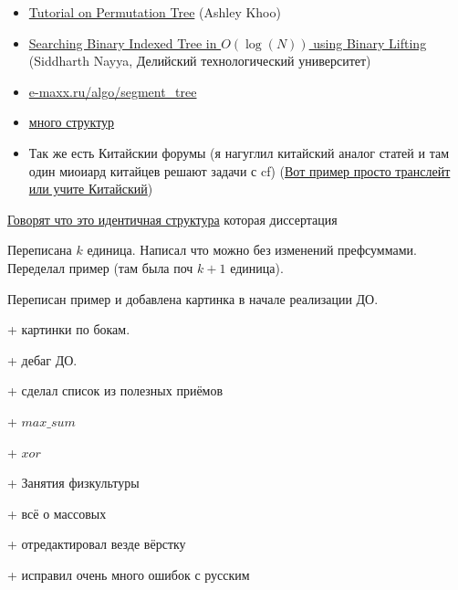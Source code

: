 \begin{itemize}
	\item \href{https://codeforces.com/blog/entry/78898}{Tutorial on Permutation Tree} (Ashley Khoo)
	
	\item \href{https://codeforces.com/blog/entry/61364}{Searching Binary Indexed Tree in $O( \log(N))$ using Binary Lifting} (Siddharth Nayya, Делийский технологический университет)
	
	\item \href{https://e-maxx.ru/algo/segment_tree}{e-maxx.ru/algo/segment\_tree}
	
	\item \href{https://codeforces.com/blog/entry/15729}{много структур}
	
	\item Так же есть Китайскии форумы (я нагуглил китайский аналог статей и там один миоиард китайцев решают задачи с cf) (\href{https://blog.csdn.net/weixin_43826249/article/details/102600666}{Вот пример просто транслейт или учите Китайский})
	
\end{itemize}


\href{https://codeforces.com/blog/entry/49446}{Говорят что это идентичная структура} которая диссертация 


Переписана $k$ единица. Написал что можно без изменений префсуммами. Переделал пример (там была поч $k + 1$ единица).

Переписан пример и добавлена картинка в начале реализации ДО.

+ картинки по бокам.

+ дебаг ДО.

+ сделал список из полезных приёмов

+ $max\_sum$

+ $xor$

+ Занятия физкультуры

+ всё о массовых

+ отредактировал везде вёрстку

+ исправил очень много ошибок с русским